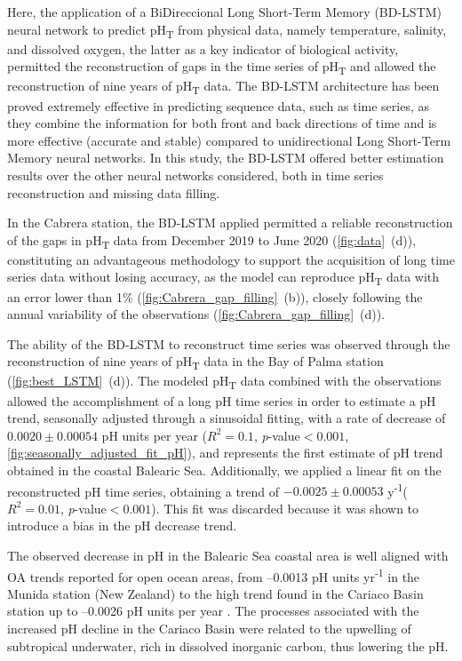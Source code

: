 Here, the application of a BiDireccional Long Short-Term Memory (BD-LSTM)
neural network to predict pH\textsubscript{T} from physical data, namely
temperature, salinity, and dissolved oxygen, the latter as a key indicator of
biological activity, permitted the reconstruction of gaps in the time series of
pH\textsubscript{T} and allowed the reconstruction of nine years of
pH\textsubscript{T} data. The BD-LSTM architecture has been proved extremely
effective in predicting sequence data, such as time series, as they combine the
information for both front and back directions of time \cite{graves2005} and
is more effective (accurate and stable) compared to unidirectional Long
Short-Term Memory neural networks. In this study, the BD-LSTM offered
better estimation results over the other neural networks considered, both in
time series reconstruction and missing data filling.

In the Cabrera station, the BD-LSTM applied permitted a reliable
reconstruction of the gaps in pH\textsubscript{T} data from December 2019 to
June 2020 (\cref{fig:data}~\textcolor{ref_color}{(d)}), constituting an
advantageous methodology to
support the acquisition of long time series data without losing accuracy, as
the model can reproduce pH\textsubscript{T} data with an error lower than 1\%
(\cref{fig:Cabrera_gap_filling}~\textcolor{ref_color}{(b)}), closely following
the annual variability
of the observations
(\cref{fig:Cabrera_gap_filling}~\textcolor{ref_color}{(d)}).

The ability of the BD-LSTM to reconstruct time series was observed through
the reconstruction of nine years of pH\textsubscript{T} data in the Bay of
Palma station (\cref{fig:best_LSTM}~\textcolor{ref_color}{(d)}). The modeled
pH\textsubscript{T} data
combined with the observations allowed the accomplishment of a long pH time
series in order to estimate a pH trend, seasonally adjusted through a
sinusoidal fitting, with a rate of decrease of $0.0020\pm 0.00054$ pH units per
year ($R^2=0.1$, \emph{p}-value$<0.001$,
\cref{fig:seasonally_adjusted_fit_pH}), and represents the first estimate of pH
trend obtained in the coastal Balearic Sea. Additionally, we applied a linear
fit on the reconstructed pH time series, obtaining a trend of $-0.0025\pm
    0.00053$ y\textsuperscript{-1}($R^2=0.01$, \emph{p}-value$<0.001$). This
fit was discarded because it was shown to introduce a bias in the pH decrease
trend.

The observed decrease in pH in the Balearic Sea coastal area is well aligned
with OA trends reported for open ocean areas, from –0.0013 pH units
yr\textsuperscript{-1} in the Munida station (New Zealand) to the high trend
found in the Cariaco Basin station up to –0.0026 pH units per
year \cite{Bates2014}. The processes associated with the increased pH decline
in
the Cariaco Basin were related to the upwelling of subtropical underwater,
rich in dissolved inorganic carbon, thus lowering the pH.

